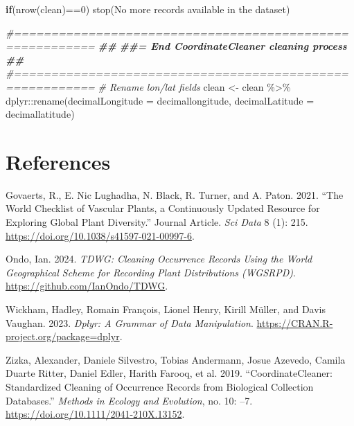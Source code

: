 \documentclass[
]{article}
\newenvironment{Shaded}{\begin{snugshade}}{\end{snugshade}}
\newcommand{\AttributeTok}[1]{\textcolor[rgb]{0.77,0.63,0.00}{#1}}
\newcommand{\CommentTok}[1]{\textcolor[rgb]{0.56,0.35,0.01}{\textit{#1}}}
\newcommand{\ControlFlowTok}[1]{\textcolor[rgb]{0.13,0.29,0.53}{\textbf{#1}}}
\newcommand{\DecValTok}[1]{\textcolor[rgb]{0.00,0.00,0.81}{#1}}
\newcommand{\DocumentationTok}[1]{\textcolor[rgb]{0.56,0.35,0.01}{\textbf{\textit{#1}}}}
\newcommand{\FunctionTok}[1]{\textcolor[rgb]{0.00,0.00,0.00}{#1}}
\newcommand{\NormalTok}[1]{#1}
\newcommand{\OtherTok}[1]{\textcolor[rgb]{0.56,0.35,0.01}{#1}}
\newcommand{\SpecialCharTok}[1]{\textcolor[rgb]{0.00,0.00,0.00}{#1}}
\newcommand{\StringTok}[1]{\textcolor[rgb]{0.31,0.60,0.02}{#1}}
\newlength{\cslhangindent}
\newlength{\cslentryspacingunit} %
\newenvironment{CSLReferences}[2] %
 {%
  \setlength{\parindent}{0pt}
  \ifodd #1
  \let\oldpar\par
  \def\par{\hangindent=\cslhangindent\oldpar}
  \fi
  \setlength{\parskip}{#2\cslentryspacingunit}
 }%
 {}
\begin{document}
\begin{Shaded}
\begin{Highlighting}[]
\ControlFlowTok{if}\NormalTok{(}\FunctionTok{nrow}\NormalTok{(clean)}\SpecialCharTok{==}\DecValTok{0}\NormalTok{) }\FunctionTok{stop}\NormalTok{(}\StringTok{\textquotesingle{}No more records available in the dataset\textquotesingle{}}\NormalTok{)}

\CommentTok{\#=========================================================}
\DocumentationTok{\#\#}
\DocumentationTok{\#\#=  End CoordinateCleaner cleaning process}
\DocumentationTok{\#\#}
\CommentTok{\#=========================================================}
\CommentTok{\# Rename lon/lat fields}
\NormalTok{clean }\OtherTok{\textless{}{-}}\NormalTok{ clean }\SpecialCharTok{\%\textgreater{}\%}
\NormalTok{  dplyr}\SpecialCharTok{::}\FunctionTok{rename}\NormalTok{(}\AttributeTok{decimalLongitude =} \StringTok{\textquotesingle{}decimallongitude\textquotesingle{}}\NormalTok{,}
                \AttributeTok{decimalLatitude =} \StringTok{\textquotesingle{}decimallatitude\textquotesingle{}}\NormalTok{)}
\end{Highlighting}
\end{Shaded}

\hypertarget{references}{%
\section*{References}\label{references}}

\hypertarget{refs}{}
\begin{CSLReferences}{1}{0}
\leavevmode{}%
Govaerts, R., E. Nic Lughadha, N. Black, R. Turner, and A. Paton. 2021.
{``The World Checklist of Vascular Plants, a Continuously Updated
Resource for Exploring Global Plant Diversity.''} Journal Article.
\emph{Sci Data} 8 (1): 215.
\url{https://doi.org/10.1038/s41597-021-00997-6}.

\leavevmode{}%
Ondo, Ian. 2024. \emph{{TDWG}: Cleaning Occurrence Records Using the
World Geographical Scheme for Recording Plant Distributions (WGSRPD)}.
\url{https://github.com/IanOndo/TDWG}.

\leavevmode{}%
Wickham, Hadley, Romain François, Lionel Henry, Kirill Müller, and Davis
Vaughan. 2023. \emph{Dplyr: A Grammar of Data Manipulation}.
\url{https://CRAN.R-project.org/package=dplyr}.

\leavevmode{}%
Zizka, Alexander, Daniele Silvestro, Tobias Andermann, Josue Azevedo,
Camila Duarte Ritter, Daniel Edler, Harith Farooq, et al. 2019.
{``CoordinateCleaner: Standardized Cleaning of Occurrence Records from
Biological Collection Databases.''} \emph{Methods in Ecology and
Evolution}, no. 10: --7. \url{https://doi.org/10.1111/2041-210X.13152}.

\end{CSLReferences}
\end{document}
